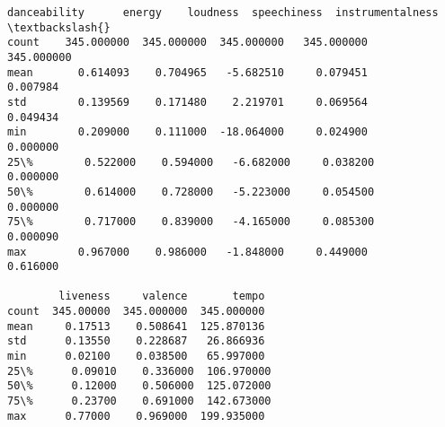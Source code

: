 \documentclass[11pt]{article}
\makeatletter
\newcommand{\boxspacing}{\kern\kvtcb@left@rule\kern\kvtcb@boxsep}
\newcommand{\prompt}[4]{
        {\ttfamily\llap{{\color{#2}[#3]:\hspace{3pt}#4}}\vspace{-\baselineskip}}
    }
\makeatother
\begin{document}
            \begin{tcolorbox}[breakable, size=fbox, boxrule=.5pt, pad at break*=1mm, opacityfill=0]
\prompt{Out}{outcolor}{20}{\boxspacing}
\begin{Verbatim}[commandchars=\\\{\}]
       danceability      energy    loudness  speechiness  instrumentalness  \textbackslash{}
count    345.000000  345.000000  345.000000   345.000000        345.000000
mean       0.614093    0.704965   -5.682510     0.079451          0.007984
std        0.139569    0.171480    2.219701     0.069564          0.049434
min        0.209000    0.111000  -18.064000     0.024900          0.000000
25\%        0.522000    0.594000   -6.682000     0.038200          0.000000
50\%        0.614000    0.728000   -5.223000     0.054500          0.000000
75\%        0.717000    0.839000   -4.165000     0.085300          0.000090
max        0.967000    0.986000   -1.848000     0.449000          0.616000

        liveness     valence       tempo
count  345.00000  345.000000  345.000000
mean     0.17513    0.508641  125.870136
std      0.13550    0.228687   26.866936
min      0.02100    0.038500   65.997000
25\%      0.09010    0.336000  106.970000
50\%      0.12000    0.506000  125.072000
75\%      0.23700    0.691000  142.673000
max      0.77000    0.969000  199.935000
\end{Verbatim}
\end{tcolorbox}
        
    \begin{tcolorbox}[breakable, size=fbox, boxrule=1pt, pad at break*=1mm,colback=cellbackground, colframe=cellborder]
\prompt{In}{incolor}{ }{\boxspacing}
\begin{Verbatim}[commandchars=\\\{\}]

\end{Verbatim}
\end{tcolorbox}


    
    
    
\end{document}
